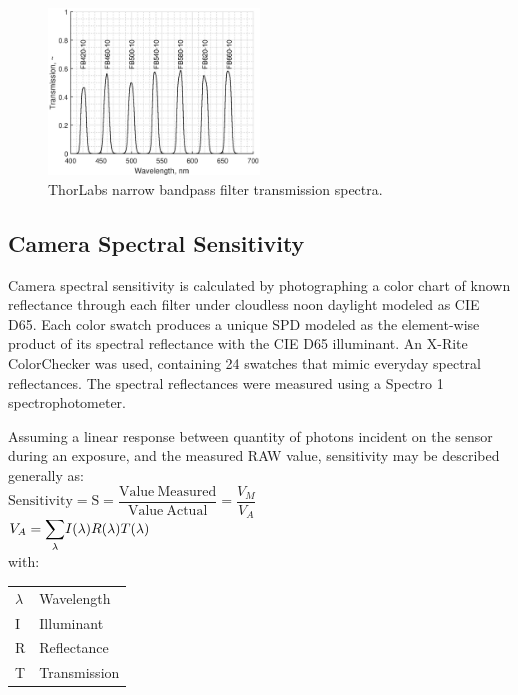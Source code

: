 \documentclass[twocolumn,10pt]{asme2ej}
\newcommand{\id}{\hspace{6 mm}}
\begin{document}
\begin{figure}
\centering
\includegraphics[width=0.5\textwidth]{thorlabs_filter_transmission_spectra.eps}
\caption{ThorLabs narrow bandpass filter transmission spectra.}
\label{thorlabs_filter_transmission_spectra}
\end{figure}

\subsection{Camera Spectral Sensitivity}

\label{Camera_Spectral_Sensitivity}

Camera spectral sensitivity is calculated by photographing a color chart of known reflectance through each filter under cloudless noon daylight modeled as CIE D65. Each color swatch produces a unique SPD modeled as the element-wise product of its spectral reflectance with the CIE D65 illuminant. An X-Rite ColorChecker was used, containing 24 swatches that mimic everyday spectral reflectances. The spectral reflectances were measured using a Spectro 1 spectrophotometer.

\id Assuming a linear response between quantity of photons incident on the sensor during an exposure, and the measured RAW value, sensitivity may be described generally as:\\

$\mathrm{ Sensitivity = S = \dfrac{Value \ Measured}{Value \ Actual} } = \dfrac{V_M}{V_A}$ \\

$V_A = \mathlarger{\sum_{\lambda}} I(\lambda) R(\lambda) T(\lambda)$ \\

 with: \\

\begin{tabular}{l | l}
$\lambda$ & Wavelength \\
I & Illuminant\\
R & Reflectance \\
T & Transmission \\
\end{tabular} \\
\end{document}
